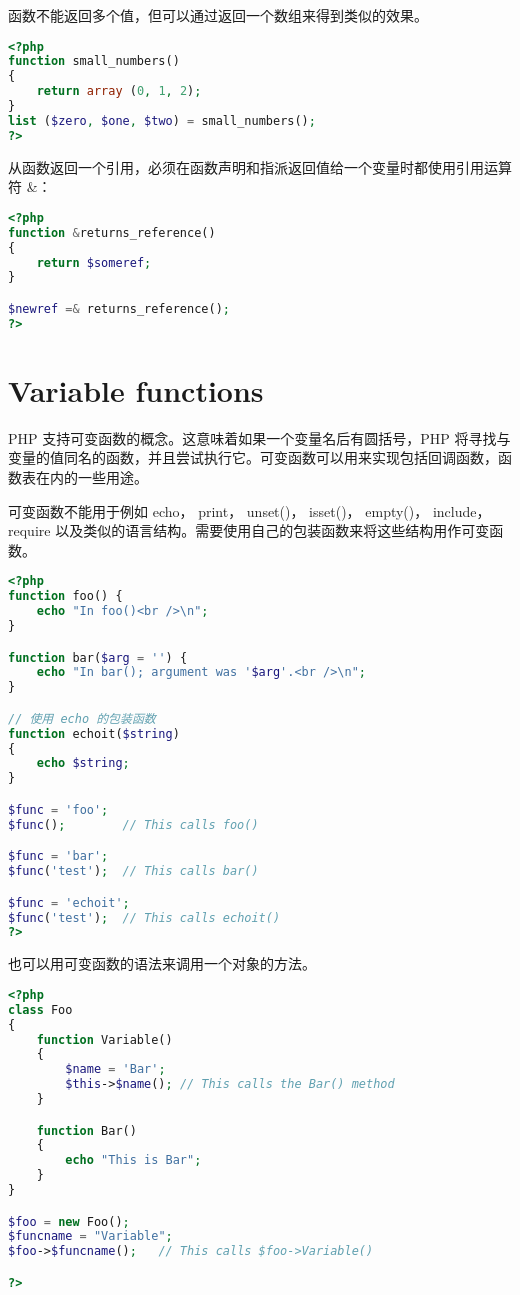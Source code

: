 函数不能返回多个值，但可以通过返回一个数组来得到类似的效果。

\begin{lstlisting}[language=PHP]
<?php
function small_numbers()
{
    return array (0, 1, 2);
}
list ($zero, $one, $two) = small_numbers();
?>
\end{lstlisting}

从函数返回一个引用，必须在函数声明和指派返回值给一个变量时都使用引用运算符 \&：

\begin{lstlisting}[language=PHP]
<?php
function &returns_reference()
{
    return $someref;
}

$newref =& returns_reference();
?>
\end{lstlisting}


\chapter{Variable functions}


PHP 支持可变函数的概念。这意味着如果一个变量名后有圆括号，PHP 将寻找与变量的值同名的函数，并且尝试执行它。可变函数可以用来实现包括回调函数，函数表在内的一些用途。


可变函数不能用于例如 echo， print， unset()， isset()， empty()， include， require 以及类似的语言结构。需要使用自己的包装函数来将这些结构用作可变函数。

\begin{lstlisting}[language=PHP]
<?php
function foo() {
    echo "In foo()<br />\n";
}

function bar($arg = '') {
    echo "In bar(); argument was '$arg'.<br />\n";
}

// 使用 echo 的包装函数
function echoit($string)
{
    echo $string;
}

$func = 'foo';
$func();        // This calls foo()

$func = 'bar';
$func('test');  // This calls bar()

$func = 'echoit';
$func('test');  // This calls echoit()
?>
\end{lstlisting}


也可以用可变函数的语法来调用一个对象的方法。

\begin{lstlisting}[language=PHP]
<?php
class Foo
{
    function Variable()
    {
        $name = 'Bar';
        $this->$name(); // This calls the Bar() method
    }

    function Bar()
    {
        echo "This is Bar";
    }
}

$foo = new Foo();
$funcname = "Variable";
$foo->$funcname();   // This calls $foo->Variable()

?>
\end{lstlisting}

